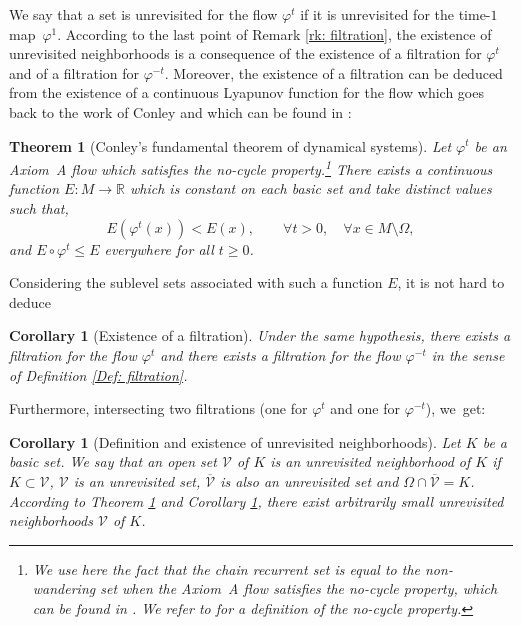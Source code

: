 \documentclass[JEP,XML,SOM,Unicode,NoEqCountersInSection,NoFloatCountersInSection,published]{cedram}
\theoremstyle{definition}
\theoremstyle{plain}
\newtheorem{thm}{Theorem}
\newtheorem{corollary}[definition]{Corollary}
\newcommand{\R}{\mathbb{R}}
\newcommand{\Vcal}{\mathcal{V}}
\begin{document}
We say that a set is unrevisited for the flow $\varphi^t$ if it is unrevisited for the time\nobreakdash-$1$ map~$\varphi^1$. According to the last point of Remark \ref{rk: filtration}, the existence of unrevisited neighborhoods is a consequence of the existence of a filtration for $\varphi^t$ and of a filtration for $\varphi^{-t}$. Moreover, the existence of a filtration can be deduced from the existence of a continuous Lyapunov function for the flow which goes back to the work of Conley \cite[p.\,20]{conley} and which can be found in \cite[Th.\,1.5.44 \& 5.3.47]{FH}:

\begin{thm}[Conley's fundamental theorem of dynamical systems]\label{prop: existence of continuous Lyapunov functions}
Let $\varphi^t$ be an Axiom~A flow which satisfies the no-cycle property.\footnote{We use here the fact that the chain recurrent set is equal to the non-wandering set when the Axiom~A flow satisfies the no-cycle property, which can be found in \cite[Th.\,5.3.47]{FH}. We refer to \cite[Def.\,5.3.42]{FH} for a definition of the no-cycle property.} There exists a continuous function $E: M \to \R$ which is constant on each basic set and take distinct values such that,
\[
E \left(\varphi^t (x) \right) < E (x), \qquad \forall t > 0, \quad \forall x \in M \setminus \Omega,
\]
and $E \circ \varphi^t \leq E$ everywhere for all $t \geq 0$.
\end{thm}

Considering the sublevel sets associated with such a function $E$, it is not hard to deduce

\begin{corollary}[Existence of a filtration]\label{cor: existence of filtrations} Under the same hypothesis, there exists a filtration for the flow $\varphi^t$ and there exists a filtration for the flow $\varphi^{-t}$ in the sense of Definition \ref{Def: filtration}.
\end{corollary}

Furthermore, intersecting two filtrations (one for $\varphi^t$ and one for $\varphi^{-t}$), we~get:

\begin{corollary}[Definition and existence of unrevisited neighborhoods]\label{prop: Robbin existence of unrevisited neighborhoods}Let $K$ be a basic set. We say that an open set $\Vcal$ of $K$ is an \emph{unrevisited neighborhood} of $K$ if $K \subset \Vcal$, $\Vcal$ is an unrevisited set, $\overline{\Vcal}$ is also an unrevisited set and $\Omega \cap \overline{\Vcal} = K$.
According to Theorem \ref{prop: existence of continuous Lyapunov functions} and Corollary \ref{cor: existence of filtrations}, there exist arbitrarily small unrevisited neighborhoods $\Vcal$ of $K$.
\end{corollary}
\end{document}
